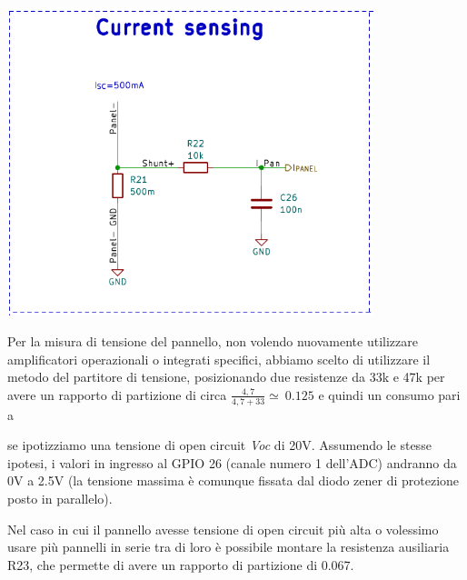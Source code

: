 \begin{center}
\includegraphics[width=4.19954in,height=3.53646in]{figures/image19.png}
\captionsetup{type=figure}
\end{center}

\noindent Per la misura di tensione del pannello, non volendo nuovamente
utilizzare amplificatori operazionali o integrati specifici, abbiamo
scelto di utilizzare il metodo del partitore di tensione, posizionando
due resistenze da 33k e 47k per avere un rapporto di partizione di circa
\(\frac{4,7}{4,7 + 33} \simeq \ 0.125\) e quindi un consumo pari a 



se ipotizziamo una tensione di open circuit \emph{Voc} di 20V.
Assumendo le stesse ipotesi, i valori in ingresso al
GPIO 26 (canale numero 1 dell'ADC) andranno da 0V a 2.5V (la tensione
massima è comunque fissata dal diodo zener di protezione posto in
parallelo).



\noindent Nel caso in cui il pannello avesse tensione di open circuit più alta o
volessimo usare più pannelli in serie tra di loro è possibile montare la
resistenza ausiliaria R23, che permette di avere un rapporto di
partizione di 0.067.



